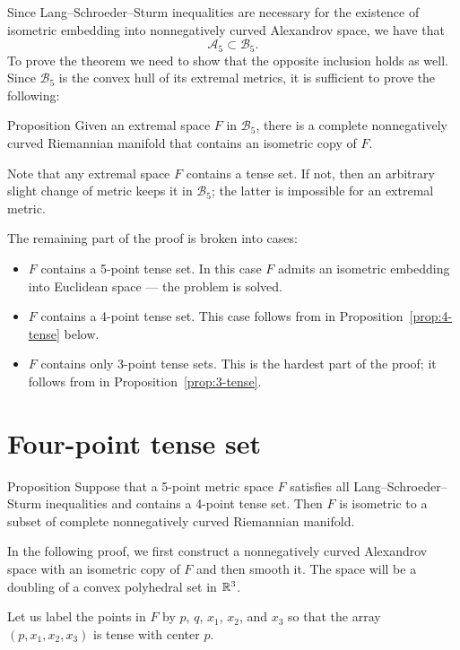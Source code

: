 \documentclass{article}
\begin{document}
Since Lang--Schroeder--Sturm inequalities are necessary for the existence of isometric embedding into nonnegatively curved Alexandrov space,
we have that 
\[\mathcal{A}_5\subset\mathcal{B}_5.\]
To prove the theorem we need to show that the opposite inclusion holds as well.
Since $\mathcal{B}_5$ is the convex hull of its extremal metrics, it is sufficient to prove the following:

\begin{thm}{Proposition}\label{prop:main}
Given an extremal space $F$ in $\mathcal{B}_5$, there is a complete nonnegatively curved Riemannian manifold that contains an isometric copy of $F$.
\end{thm}

Note that any extremal space  $F$ contains a tense set.
If not, then an arbitrary slight change of metric keeps it in $\mathcal{B}_5$;
the latter is impossible for an extremal metric.

The remaining part of the proof is broken into cases:
\begin{itemize}
\item $F$ contains a 5-point tense set.
In this case $F$ admits an isometric embedding into Euclidean space --- the problem is solved.
\item $F$ contains a 4-point  tense set.
This case follows from in Proposition~\ref{prop:4-tense} below.
\item $F$ contains only 3-point  tense sets. This is the hardest part of the proof; it follows from in Proposition~\ref{prop:3-tense}.
\qeds
\end{itemize}

\section{Four-point tense set}\label{sec:4-tense}

\begin{thm}{Proposition}\label{prop:4-tense}
Suppose that a 5-point metric space $F$ satisfies all Lang--Schroeder--Sturm inequalities and contains a 4-point tense set.
Then $F$ is isometric to a subset of complete nonnegatively curved Riemannian manifold. 
\end{thm}

In the following proof, we first construct a nonnegatively curved Alexandrov space with an isometric copy of $F$ and then smooth it.
The space will be a doubling of a convex polyhedral set in $\mathbb{R}^3$.

Let us label the points in $F$ by $p$, $q$, $x_1$, $x_2$, and $x_3$ so that the array $(p,x_1,x_2,x_3)$ is tense with center $p$.
\end{document}
